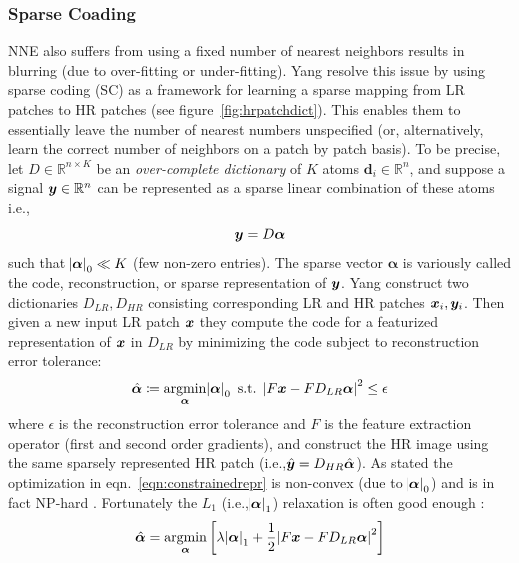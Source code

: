 \subsubsection{Sparse Coading}\label{subsubsec:sparsecoding}
NNE also suffers from using a fixed number of nearest neighbors results in blurring (due to over-fitting or under-fitting).
%
Yang \etal \cite{yang2008} resolve this issue by using sparse coding (SC) as a framework for learning a sparse mapping from LR patches to HR patches (see figure~\ref{fig:hrpatchdict}).
%
This enables them to essentially leave the number of nearest numbers unspecified (or, alternatively, learn the correct number of neighbors on a patch by patch basis).
%
To be precise, let \(D \in \mathbb{R}^{n \times K}\) be an \textit{over-complete dictionary} of \(K\) atoms \(\bm{d}_i \in \mathbb{R}^n\), and suppose a signal \(\bm{y} \in \mathbb{R}^n\) can be represented as a sparse linear combination of these atoms i.e.,\begin{equation}
    \bm{y} = D\bm{\alpha}
\end{equation}
such that \(\abs{ \bm{\alpha} }_0 \ll K\) (few non-zero entries).
%
The sparse vector \(\bm{\alpha}\) is variously called the code, reconstruction, or sparse representation of \(\bm{y}\).
%
Yang \etal construct two dictionaries \(D_{LR}, D_{HR}\) consisting corresponding LR and HR patches \(\bm{x}_i, \bm{y}_i\).
%
Then given a new input LR patch \(\bm{x}\) they compute the code for a featurized representation of \(\bm{x}\) in \(D_{LR}\) by minimizing the code subject to reconstruction error tolerance:
\begin{equation}
    \hat{\bm{\alpha}} \coloneqq \underset{\bm{\alpha}}{\text{argmin}} \abs{ \bm{\alpha} }_0 \text{ s.t. } \abs{ F\bm{x} - FD_{LR}\bm{\alpha} }^2 \leq \epsilon
    \label{eqn:constrainedrepr}
\end{equation}
where \(\epsilon\) is the reconstruction error tolerance and \(F\) is the feature extraction operator (first and second order gradients), and construct the HR image using the same sparsely represented HR patch (i.e.,\(\hat{\bm{y}} = D_{HR} \hat{\bm{\alpha}}\)).
%
As stated the optimization in eqn.~\eqref{eqn:constrainedrepr} is non-convex (due to \(\abs{ \bm{\alpha} }_0\)) and is in fact NP-hard \cite{tilman2015}.
%
Fortunately the \(L_1\) (i.e.,\(\abs{ \bm{\alpha} }_1\)) relaxation is often good enough \cite{Donoho9446}:
\begin{equation}
    \hat{\bm{\alpha}} = \underset{\bm{\alpha}}{\text{argmin}} \left[ \lambda\abs{ \bm{\alpha} }_1 + \frac{1}{2}\abs{ F\bm{x} - FD_{LR}\bm{\alpha} }^2 \right]
    \label{eqn:lagrangerepr}
\end{equation}
